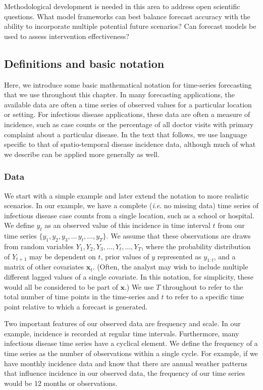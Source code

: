 \documentclass[a4paper]{article}
\newcommand{\ie}{\textit{i}.\textit{e}. }
\begin{document}
Methodological development is needed in this area to address open scientific questions.
What model frameworks can best balance forecast accuracy with the ability to incorporate multiple potential future scenarios?
Can forecast models be used to assess intervention effectiveness?

\subsection{Definitions and basic notation}
\label{sec:notation}

Here, we introduce some basic mathematical notation for time-series forecasting that we use throughout this chapter.
In many forecasting applications, the available data are often a time series of observed values for a particular location or setting.
For infectious disease applications, these data are often a measure of incidence, such as case counts or the percentage of all doctor visits with primary complaint about a particular disease.
In the text that follows, we use language specific to that of spatio-temporal disease incidence data, although much of what we describe can be applied more generally as well.

\subsubsection*{Data}

We start with a simple example and later extend the notation to more realistic scenarios.
In our example, we have a complete (\ie no missing data) time series of infectious disease case counts from a single location, such as a school or hospital. 
We define $y_t$ as an observed value of this incidence in time interval $t$ from our time series $\{y_1, y_2, y_3, \dots\, y_t, \dots, y_T\}$.
We assume that these observations are draws from random variables $Y_1, Y_2, Y_3, \dots, Y_t, \dots, Y_T$, where the probability distribution of $Y_{t+1}$ may be dependent on $t$, prior values of $y$ represented as $y_{1:t}$, and a matrix of other covariates $\mathbf{x}_t$.
(Often, the analyst may wish to include multiple different lagged values of a single covariate. In this notation, for simplicity, these would all be considered to be part of $\mathbf{x}$.)
We use $T$ throughout to refer to the total number of time points in the time-series and $t$ to refer to a specific time point relative to which a forecast is generated.

Two important features of our observed data are frequency and scale.
In our example, incidence is recorded at regular time intervals.
Furthermore, many infectious disease time series have a cyclical element.
We define the frequency of a time series as the number of observations within a single cycle.
For example, if we have monthly incidence data and know that there are annual weather patterns that influence incidence in our observed data, the frequency of our time series would be 12 months or observations. 
\end{document}
